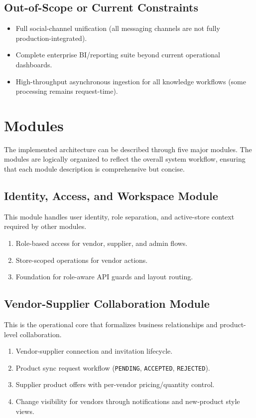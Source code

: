 \subsection{Out-of-Scope or Current Constraints}

\begin{itemize}
    \item Full social-channel unification (all messaging channels are not fully production-integrated).
    \item Complete enterprise BI/reporting suite beyond current operational dashboards.
    \item High-throughput asynchronous ingestion for all knowledge workflows (some processing remains request-time).
\end{itemize}

\section{Modules}

The implemented architecture can be described through five major modules. The modules are logically organized to reflect the overall system workflow, ensuring that each module description is comprehensive but concise.

\subsection{Identity, Access, and Workspace Module}

This module handles user identity, role separation, and active-store context required by other modules.

\begin{enumerate}
    \item Role-based access for vendor, supplier, and admin flows.
    \item Store-scoped operations for vendor actions.
    \item Foundation for role-aware API guards and layout routing.
\end{enumerate}

\subsection{Vendor-Supplier Collaboration Module}

This is the operational core that formalizes business relationships and product-level collaboration.

\begin{enumerate}
    \item Vendor-supplier connection and invitation lifecycle.
    \item Product sync request workflow (\texttt{PENDING}, \texttt{ACCEPTED}, \texttt{REJECTED}).
    \item Supplier product offers with per-vendor pricing/quantity control.
    \item Change visibility for vendors through notifications and new-product style views.
\end{enumerate}

